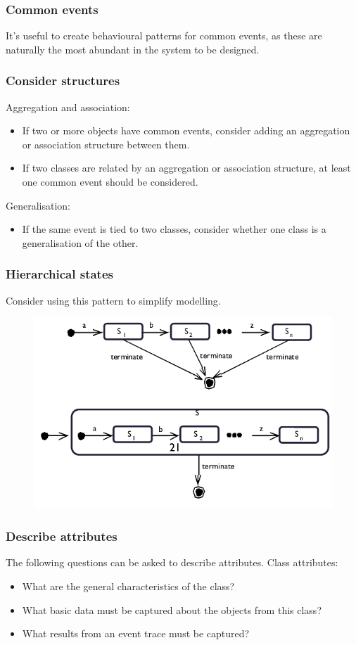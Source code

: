 \subsubsection{Common events}
It's useful to create behavioural patterns for common events, as these are naturally the most abundant in the system to be designed.

\subsubsection{Consider structures}
Aggregation and association:
\begin{itemize}
    \item If two or more objects have common events, consider adding an aggregation or association structure between them.
    \item If two classes are related by an aggregation or association structure, at least one common event should be considered.
\end{itemize}
\noindent Generalisation:
\begin{itemize}
    \item If the same event is tied to two classes, consider whether one class is a generalisation of the other.
\end{itemize}

\subsubsection{Hierarchical states}
Consider using this pattern to simplify modelling.

\begin{figure}[H]
    \centering
    \includegraphics[width=.65\textwidth]{figures/hierarchicalstate.png}
\end{figure}

\subsubsection{Describe attributes}
The following questions can be asked to describe attributes. Class attributes:
\begin{itemize}
    \item What are the general characteristics of the class?
    \item What basic data must be captured about the objects from this class?
    \item What results from an event trace must be captured?
\end{itemize}

